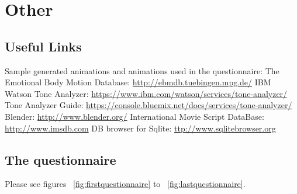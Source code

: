 \chapter{Other \label{chap:otherappendices}}


\section{Useful Links}
Sample generated animations and animations used in the questionnaire: \videoshost \newline
The Emotional Body Motion Database: \url{http://ebmdb.tuebingen.mpg.de/} \newline
IBM Watson Tone Analyzer: \url{https://www.ibm.com/watson/services/tone-analyzer/} \newline
Tone Analyzer Guide: \url{https://console.bluemix.net/docs/services/tone-analyzer/} \newline
Blender: \url{http://www.blender.org/} \newline
International Movie Script DataBase: \url{http://www.imsdb.com} \newline
DB browser for Sqlite: \url{ttp://www.sqlitebrowser.org} \newline


\section{The questionnaire \label{sec:appquestionnaire}}
Please see figures ~\ref{fig:firstquestionnaire} to ~\ref{fig:lastquestionnaire}.


